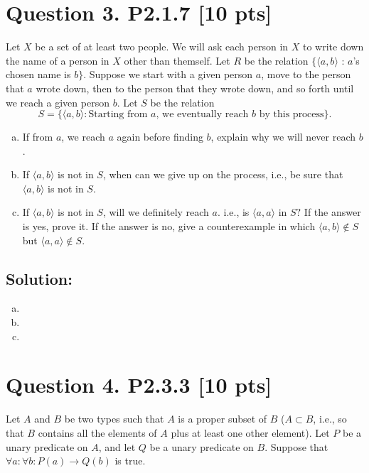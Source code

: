 \documentclass[12pt]{article}
\begin{document}
\section*{\textbf{Question 3. P2.1.7} [10 pts]}
 Let $X$ be a set of at least two people.  We will ask each person in $X$ to write down the name of a person in $X$ other than themself. Let $R$ be the relation $\{\langle a, b\rangle$ : $a$’s chosen name is $b\}$. Suppose we start with a given person $a$, move to the person that $a$ wrote down, then to the person that they wrote down, and so forth until we reach a given person $b$. Let $S$ be the relation 
 $$ S =\{\langle a, b\rangle: \mbox{Starting from $a$, we eventually reach $b$ by this process}\}.$$
\begin{enumerate}[(a)]
    \item  If from $a$, we reach $a$ again before finding $b$, explain why we will never reach $b$.

    \item  If $\langle a, b\rangle$ is not in $S$, when can we give up on the process, i.e., be  sure that $\langle a, b\rangle$ is not in $S.$
    
    \item  If $\langle a, b\rangle$ is not in $S$,  will we definitely reach $a$. i.e., is $\langle a, a\rangle$ in $S?$ If the answer is yes, prove it.  If the answer is no, give a counterexample in which 
    $\langle a, b\rangle \not\in S$ but $\langle a, a\rangle \not\in S.$ 

\end{enumerate}


\subsection*{\textbf{Solution:}} %
\begin{enumerate}[(a)]
\item 
\item 
\item 
\end{enumerate}



\newpage

\section*{\textbf{Question 4. P2.3.3} [10 pts]}
 Let $A$ and $B$ be two types such that $A$ is a proper subset of $B$ ($A \subset B$, i.e., so that $B$ contains all the elements of $A$ plus at least one other element). Let $P$ be a unary predicate on $A$, and let $Q$ be a unary predicate on $B$. Suppose that $\forall a: \forall b : P(a) \rightarrow Q(b)$ is true.
 
\end{document}
